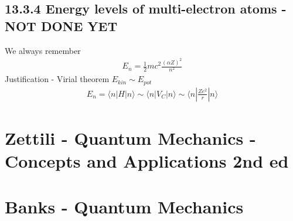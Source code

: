 \documentclass[../main.tex]{subfiles}
\begin{document}
\subsection{13.3.4 Energy levels of multi-electron atoms - NOT DONE YET}
We always remember
\begin{align}
E_n=\frac{1}{2}mc^2\frac{(\alpha Z)^2}{n^2}
\end{align}
Justification - Virial theorem $E_{kin}\sim E_{pot}$
\begin{align}
E_n
=\langle n|H|n\rangle
\sim\langle n|V_C|n\rangle
\sim\langle n|\frac{Ze^2}{r}|n\rangle
\end{align}

\section{{\sc Zettili} - Quantum Mechanics - Concepts and Applications 2nd ed}

\section{{\sc Banks} - Quantum Mechanics}
\end{document}

